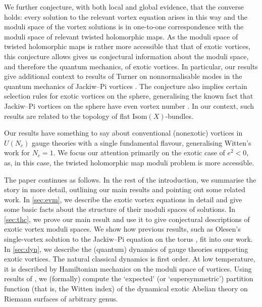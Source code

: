 \documentclass[10pt]{article}
\theoremstyle{definition}
\begin{document}
We further conjecture, with both local and global evidence, that the converse holds: every solution to the relevant vortex equation arises in this way and the moduli space of the vortex solutions is in one-to-one correspondence with the moduli space of relevant twisted holomorphic maps. As the moduli space of twisted holomorphic maps is rather more accessible that that of exotic vortices, this conjecture allows gives us conjectural information about the moduli space, and therefore the quantum mechanics, of exotic vortices. 
In particular, our results give additional context to results of Turner on nonnormalisable modes in the quantum mechanics of Jackiw--Pi vortices \cite{turnerQO}. The conjecture also implies certain selection rules for exotic vortices on the sphere, generalising the known fact that Jackiw--Pi vortices on the sphere have even vortex number \cite{jackiwSSS}. In our context, such results are related to the topology of flat \(\text{Isom}(X)\)-bundles.

Our results have something to say about conventional (nonexotic) vortices in \(U(N_c)\) gauge theories with a single fundamental flavour, generalising Witten's work \cite{wittenMPS} for \(N_c = 1\). We focus our attention primarily on the exotic case of \(e^2<0\), as, in this case, the twisted holomorphic map moduli problem is more accessible. 

The paper continues as follows. In the rest of the introduction, we summarise the story in more detail, outlining our main results and pointing out some related work. In \autoref{sec:evm}, we describe the exotic vortex equations in detail and give some basic facts about the structure of their moduli spaces of solutions. In \autoref{sec:thc}, we prove our main result and use it to give conjectural descriptions of exotic vortex moduli spaces. We show how previous results, such as Olesen's single-vortex solution to the Jackiw--Pi equation on the torus \cite{olesenSC}, fit into our work. In \autoref{sec:dyn}, we describe the (quantum) dynamics of gauge theories supporting exotic vortices. The natural classical dynamics is first order. At low temperature, it is described by Hamiltonian mechanics on the moduli space of vortices. Using results of \cite{waltonVC}, we (formally) compute the `expected' (or `supersymmetric') partition function (that is, the Witten index) of the dynamical exotic Abelian theory on Riemann surfaces of arbitrary genus. 




\end{document}
